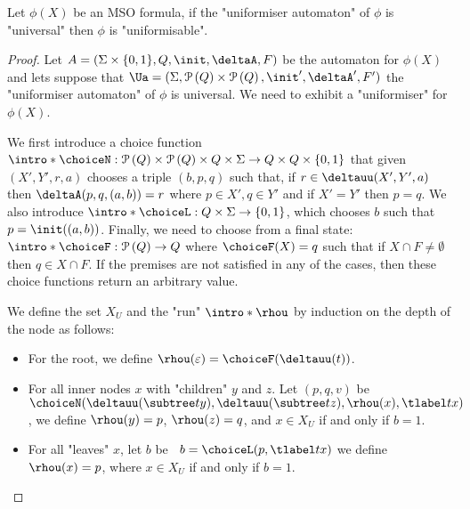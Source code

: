 \documentclass[a4paper,UKenglish,cleveref, autoref, thm-restate]{lipics-v2021}
\begin{document}
\begin{lemma}\label{lemma:universal-implies-uniformisable}
	Let $\phi(X)$ be an MSO formula, if the "uniformiser automaton" of $\phi$ is "universal" then $\phi$ is "uniformisable".
\end{lemma}
\begin{proof}
	Let $A =  (\Sigma \times \{0,1\}, Q, \init, \deltaA, F)$ be the automaton for $\phi(X)$ and lets suppose that
	$\Ua = (\Sigma, \parts Q \times \parts Q,\init', \deltaA', F')$ the "uniformiser automaton" of $\phi$ is universal.
	We need to exhibit a "uniformiser" for $\phi(X)$.

	\AP We first introduce a choice function $\intro*\choiceN : \parts Q \times \parts Q \times Q \times \Sigma \to Q \times Q \times \set{0,1}$
	that given $(X',Y',r,a)$ chooses a triple $(b,p,q)$ such that, if $r \in \deltauu(X',Y', a)$ then $\deltaA(p,q,(a,b)) = r$ where $p \in X', q \in Y'$
	and if $X' = Y'$ then $p = q$.
	We also introduce $\intro* \choiceL : Q \times \Sigma \to \set{0,1} $, which chooses
	$b$ such that $p = \init((a,b))$.
	Finally, we need to choose from a final state: $\intro* \choiceF : \parts Q \to  Q$ where
	$\choiceF (X) = q$ such that if $X \cap F \neq \emptyset$ then $q \in X \cap F$. If the premises are not satisfied in any of the cases, then
	these choice functions return an arbitrary value.

	\AP We define the set $X_U$ and the "run" $\intro*\rhou$  by induction on the depth of the node as follows:
	\begin{itemize}
		\item For the root, we define $\rhou(\varepsilon) = \choiceF(\deltauu(t))$.
		\item For all inner nodes $x$ with "children" $y$ and $z$. Let $(p,q,v)$ be $\choiceN(\deltauu(\subtree t y), \deltauu(\subtree t z), \rhou(x), \tlabel t x)$, we define
		      $\rhou(y)=p$, $\rhou(z)=q$, and $x \in X_U$ if and only if $b = 1$.
		\item For all "leaves" $x$, let $b$ be ~$b = \choiceL(p, \tlabel t x)$ we define $\rhou (x) = p$, where $x \in X_U$ if and only if $b = 1$.
	\end{itemize}


\end{proof}
\end{document}
